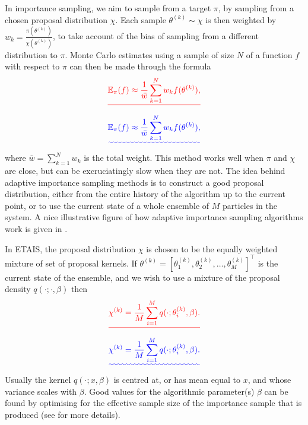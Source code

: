 \documentclass[final]{siamltex}
\newcommand{\edit}[1]{{\color{red} #1}}  %
\providecommand{\DIFadd}[1]{{\protect\color{blue}\uwave{#1}}} %
\providecommand{\DIFdel}[1]{{\protect\color{red}\sout{#1}}}                      %
\providecommand{\DIFaddbegin}{} %
\providecommand{\DIFaddend}{} %
\providecommand{\DIFdelbegin}{} %
\providecommand{\DIFdelend}{} %
\newcommand{\DIFscaledelfig}{0.5}
\newlength{\DIFdelgraphicswidth} %
\newlength{\DIFdelgraphicsheight} %
\newcommand{\DIFaddincludegraphics}[2][]{{\color{blue}\fbox{\DIFOincludegraphics[#1]{#2}}}} %
\newcommand{\DIFdelincludegraphics}[2][]{%
\sbox{\DIFdelgraphicsbox}{\DIFOincludegraphics[#1]{#2}}%
\settoboxwidth{\DIFdelgraphicswidth}{\DIFdelgraphicsbox} %
\settoboxtotalheight{\DIFdelgraphicsheight}{\DIFdelgraphicsbox} %
\scalebox{\DIFscaledelfig}{%
\parbox[b]{\DIFdelgraphicswidth}{\usebox{\DIFdelgraphicsbox}\\[-\baselineskip] \rule{\DIFdelgraphicswidth}{0em}}\llap{\resizebox{\DIFdelgraphicswidth}{\DIFdelgraphicsheight}{%
\setlength{\unitlength}{\DIFdelgraphicswidth}%
\begin{picture}(1,1)%
\thicklines\linethickness{2pt} %
{\color[rgb]{1,0,0}\put(0,0){\framebox(1,1){}}}%
{\color[rgb]{1,0,0}\put(0,0){\line( 1,1){1}}}%
{\color[rgb]{1,0,0}\put(0,1){\line(1,-1){1}}}%
\end{picture}%
}\hspace*{3pt}}} %
} %
\DeclareRobustCommand{\DIFaddbegin}{\DIFOaddbegin \let\includegraphics\DIFaddincludegraphics} %
\DeclareRobustCommand{\DIFaddend}{\DIFOaddend \let\includegraphics\DIFOincludegraphics} %
\DeclareRobustCommand{\DIFdelbegin}{\DIFOdelbegin \let\includegraphics\DIFdelincludegraphics} %
\DeclareRobustCommand{\DIFdelend}{\DIFOaddend \let\includegraphics\DIFOincludegraphics} %
\begin{document}
In importance sampling, we aim to sample from a target $\pi$, by
sampling from a chosen proposal distribution $\chi$. Each sample $\theta^{(k)} \sim \chi$ is then weighted by
$w_k = \frac{\pi(\theta^{(k)})}{\chi(\theta^{(k)})}$, to take account of the bias of
sampling from a different distribution to $\pi$. Monte Carlo estimates
using a sample of size $N$
of a function $f$ with respect to $\pi$ can then be made through the
formula
\DIFdelbegin \[\DIFdel{\mathbb{E}_\pi(f) \approx \frac{1}{\bar{w}} \sum_{k=1}^N
  w_kf(\theta^{(k)}),}\]
\DIFdelend \DIFaddbegin \begin{equation} \DIFadd{\mathbb{E}_\pi(f) \approx \frac{1}{\bar{w}} \sum_{k=1}^N
  w_kf(\theta^{(k)}),}\end{equation}
\DIFaddend where $\bar{w} = \sum_{k=1}^N w_k$ is the total weight.
This method works well when $\pi$ and $\chi$ are close, but can be
excruciatingly slow when they are not. The idea behind adaptive
importance sampling methods is
to construct a good proposal distribution, either from the entire
history of the algorithm up to the current point, or to use the
current state of a whole ensemble of $M$ particles in the system.  \DIFaddbegin \edit{A nice illustrative figure of how adaptive
  importance sampling algorithms work is given in \cite{bugallo2017adaptive}.}
\DIFaddend 

In ETAIS, the proposal distribution $\chi$ is chosen to be the equally
weighted mixture of set of proposal kernels. If $\theta^{(k)} = [\theta_1^{(k)},
\theta_2^{(k)}, \ldots, \theta_M^{(k)}]^\top$ is the current state of the
ensemble, and we wish to use a mixture of the proposal density $q(\cdot ;
\cdot, \beta)$ then 
\DIFdelbegin \[\DIFdel{\chi^{(k)} = \frac{1}{M} \sum_{i=1}^M q(\cdot ; \theta_i^{(k)},
\beta).}\]
\DIFdelend \DIFaddbegin \begin{equation}\DIFadd{\chi^{(k)} = \frac{1}{M} \sum_{i=1}^M q(\cdot ; \theta_i^{(k)},
\beta).}\end{equation}
\DIFaddend Usually the kernel $q(\cdot ;
x,\beta)$ is centred at, or has mean equal to $x$, and whose variance
scales with $\beta$. Good values for the
algorithmic parameter(s) $\beta$ can be
found by optimising for the effective sample size of the importance
sample that is produced (see \cite{cotter2015parallel, russ2017parallel} for more details).
\end{document}
